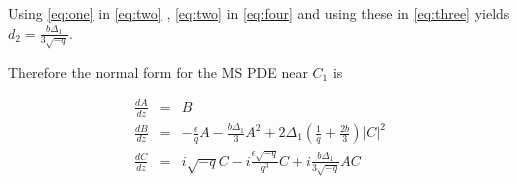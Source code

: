 Using \eqref{eq:one} in \eqref{eq:two} , \eqref{eq:two} in \eqref{eq:four} and using these in \eqref{eq:three} yields $ d_2 = \frac{ b \Delta_1 }{ 3 \sqrt{-q} } $.

Therefore the normal form for the MS PDE near $C_1$ is 

\begin{subequations}
\begin{eqnarray}
\frac{dA}{dz} &=& B \\ \label{eq:normalA}
\frac{dB}{dz} &=& -\frac{\epsilon}{q} A - \frac{b \Delta_1 }{3} A^2 + 2 \Delta_1 \left(\frac{1}{q} + \frac{2 b }{3} \right) \left|C\right|^2 \\ \label{eq:normalB}
\frac{dC}{dz} &=& i \sqrt{-q} C - i \frac{\epsilon \sqrt{-q} }{q^3} C + i \frac{b \Delta_1}{3 \sqrt{-q}} A C \label{eq:normalC}
\end{eqnarray}
\end{subequations}
